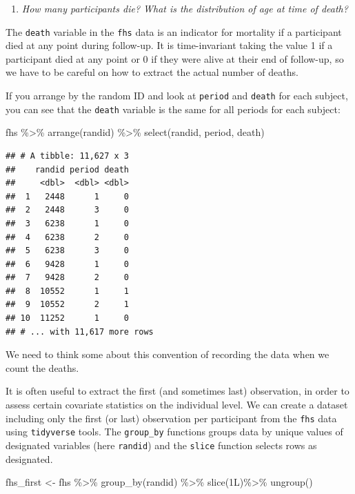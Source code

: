 \documentclass[
]{book}
\newenvironment{Shaded}{\begin{snugshade}}{\end{snugshade}}
\newcommand{\FunctionTok}[1]{\textcolor[rgb]{0.00,0.00,0.00}{#1}}
\newcommand{\NormalTok}[1]{#1}
\newcommand{\OtherTok}[1]{\textcolor[rgb]{0.56,0.35,0.01}{#1}}
\newcommand{\SpecialCharTok}[1]{\textcolor[rgb]{0.00,0.00,0.00}{#1}}
\providecommand{\tightlist}{%
  \setlength{\itemsep}{0pt}\setlength{\parskip}{0pt}}
\begin{document}
\begin{enumerate}
\def\labelenumi{\arabic{enumi}.}
\setcounter{enumi}{2}
\tightlist
\item
  \emph{How many participants die? What is the distribution of age at time of death?}
\end{enumerate}

The \texttt{death} variable in the \texttt{fhs} data is an indicator for mortality if a participant died at any point during follow-up. It is time-invariant taking the value 1 if a participant died at any point or 0 if they were alive at their end of follow-up, so we have to be careful on how to extract the actual number of deaths.

If you arrange by the random ID and look at \texttt{period} and \texttt{death} for each subject,
you can see that the \texttt{death} variable is the same for all periods for each
subject:

\begin{Shaded}
\begin{Highlighting}[]
\NormalTok{fhs }\SpecialCharTok{\%\textgreater{}\%} 
  \FunctionTok{arrange}\NormalTok{(randid) }\SpecialCharTok{\%\textgreater{}\%} 
  \FunctionTok{select}\NormalTok{(randid, period, death)}
\end{Highlighting}
\end{Shaded}

\begin{verbatim}
## # A tibble: 11,627 x 3
##    randid period death
##     <dbl>  <dbl> <dbl>
##  1   2448      1     0
##  2   2448      3     0
##  3   6238      1     0
##  4   6238      2     0
##  5   6238      3     0
##  6   9428      1     0
##  7   9428      2     0
##  8  10552      1     1
##  9  10552      2     1
## 10  11252      1     0
## # ... with 11,617 more rows
\end{verbatim}

We need to think some about this convention of recording the data when we count
the deaths.

It is often useful to extract the first (and sometimes last) observation, in order to assess certain covariate statistics on the individual level. We can create a dataset including only the first (or last) observation per participant from the \texttt{fhs} data using \texttt{tidyverse} tools. The \texttt{group\_by} functions groups data by unique values of designated variables (here \texttt{randid}) and the \texttt{slice} function selects rows as designated.

\begin{Shaded}
\begin{Highlighting}[]
\NormalTok{fhs\_first }\OtherTok{\textless{}{-}}\NormalTok{ fhs }\SpecialCharTok{\%\textgreater{}\%} 
  \FunctionTok{group\_by}\NormalTok{(randid) }\SpecialCharTok{\%\textgreater{}\%} 
  \FunctionTok{slice}\NormalTok{(1L)}\SpecialCharTok{\%\textgreater{}\%}
  \FunctionTok{ungroup}\NormalTok{()}
\end{Highlighting}
\end{Shaded}
\end{document}
